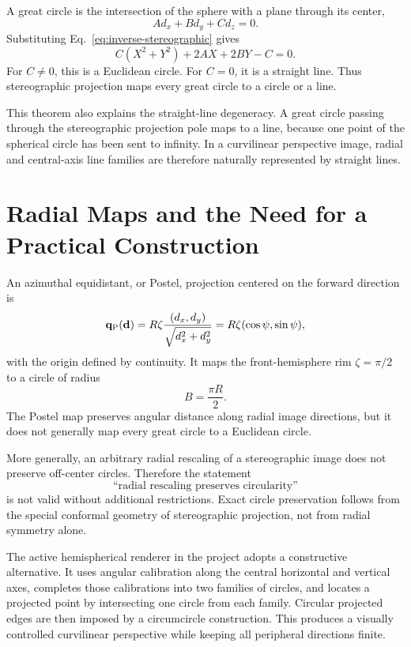 A great circle is the intersection of the sphere with a plane through its center,
\begin{equation}
  A d_x+B d_y+C d_z=0.
  \label{eq:great-circle-plane}
\end{equation}
Substituting Eq.~\eqref{eq:inverse-stereographic} gives
\begin{equation}
  C(X^2+Y^2)+2AX+2BY-C=0.
  \label{eq:stereographic-circle}
\end{equation}
For $C\neq0$, this is a Euclidean circle.  For $C=0$, it is a straight line.  Thus stereographic projection maps every great circle to a circle or a line.

This theorem also explains the straight-line degeneracy.  A great circle passing through the stereographic projection pole maps to a line, because one point of the spherical circle has been sent to infinity.  In a curvilinear perspective image, radial and central-axis line families are therefore naturally represented by straight lines.

\section{Radial Maps and the Need for a Practical Construction}
An azimuthal equidistant, or Postel, projection centered on the forward direction is
\begin{equation}
  \vb q_{\rm P}(\vb d)
  =R\zeta\frac{(d_x,d_y)}{\sqrt{d_x^2+d_y^2}}
  =R\zeta(\cos\psi,\sin\psi),
  \label{eq:postel}
\end{equation}
with the origin defined by continuity.  It maps the front-hemisphere rim $\zeta=\pi/2$ to a circle of radius
\begin{equation}
  B=\frac{\pi R}{2}.
  \label{eq:boundary-radius}
\end{equation}
The Postel map preserves angular distance along radial image directions, but it does not generally map every great circle to a Euclidean circle.

More generally, an arbitrary radial rescaling of a stereographic image does not preserve off-center circles.  Therefore the statement
\begin{equation}
  \text{``radial rescaling preserves circularity''}
\end{equation}
is not valid without additional restrictions.  Exact circle preservation follows from the special conformal geometry of stereographic projection, not from radial symmetry alone.

The active hemispherical renderer in the project adopts a constructive alternative.  It uses angular calibration along the central horizontal and vertical axes, completes those calibrations into two families of circles, and locates a projected point by intersecting one circle from each family.  Circular projected edges are then imposed by a circumcircle construction.  This produces a visually controlled curvilinear perspective while keeping all peripheral directions finite.
